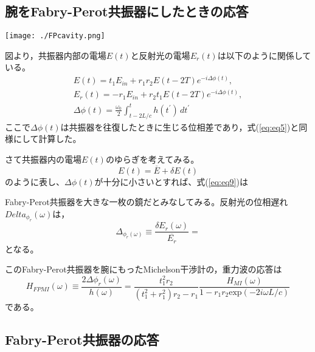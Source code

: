 \subsection{腕をFabry-Perot共振器にしたときの応答}

\begin{center}
\texttt{[image: ./FPcavity.png]}
\end{center}

図より，共振器内部の電場$E(t)$と反射光の電場$E_{r}(t)$は以下のように関係している。
\begin{eqnarray}
  E(t) = t_{1}E_{in} + r_{1}r_{2}E(t-2T)e^{-i\Delta{\phi(t)}}, \\\label{eq:eq9}
  E_{r}(t) = -r_{1}E_{in} + r_{2}t_{1}E(t-2T)e^{-i\Delta{\phi(t)}},\\\label{eq:eq10}
  \Delta\phi(t) = \frac{\omega_{0}}{2}\int_{t-2L/c}^{t} h(t^{\prime})\, dt^{\prime} \label{eq:eq11}
\end{eqnarray}
ここで$\Delta{\phi(t)}$は共振器を往復したときに生じる位相差であり，式(\ref{eq:eq5})と同様にして計算した。


さて共振器内の電場$E(t)$のゆらぎを考えてみる。
\begin{equation}
  E(t) = \overline{E} + \delta{E(t)}
\end{equation}
のように表し、$\Delta\phi(t)$が十分に小さいとすれば、式(\ref{eq:eq9})は
\begin{equation}
\boxed{}
\end{equation}



Fabry-Perot共振器を大きな一枚の鏡だとみなしてみる。反射光の位相遅れ$Delta_{\phi_{r}}(\omega)$は，
\begin{equation}
\Delta_{\phi_{r}(\omega)} \equiv \frac{\delta{E_{r}}(\omega)}{\overline{E_{r}}} = 
\end{equation}
となる。


このFabry-Perot共振器を腕にもったMichelson干渉計の，重力波の応答は
\begin{equation}
\boxed{H_{FPMI}(\omega) \equiv \frac{2\Delta{\phi_{r}(\omega)}}{h(\omega)} = \frac{t_{1}^{2}r_{2}}{(t_{1}^{2}+r_{1}^{2})r_{2}-r_{1}}\frac{H_{MI}(\omega)}{1-r_{1}r_{2}\mathrm{exp}(-2i\omega{L}/c)}}
\end{equation}
である。

\subsection{Fabry-Perot共振器の応答}

